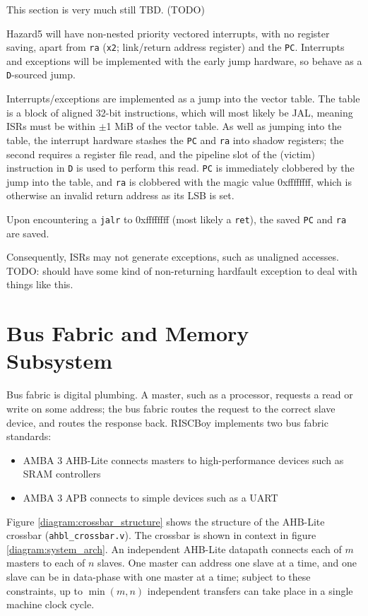 \documentclass[notitlepage]{article}
\begin{document}
This section is very much still TBD. (TODO)

Hazard5 will have non-nested priority vectored interrupts, with no register saving, apart from \texttt{ra} (\texttt{x2}; link/return address register) and the \texttt{PC}. Interrupts and exceptions will be implemented with the early jump hardware, so behave as a \texttt{D}-sourced jump.

Interrupts/exceptions are implemented as a jump into the vector table. The table is a block of aligned 32-bit instructions, which will most likely be JAL, meaning ISRs must be within $\pm$1 MiB of the vector table. As well as jumping into the table, the interrupt hardware stashes the \texttt{PC} and \texttt{ra} into shadow registers; the second requires a register file read, and the pipeline slot of the (victim) instruction in \texttt{D} is used to perform this read. \texttt{PC} is immediately clobbered by the jump into the table, and \texttt{ra} is clobbered with the magic value 0xffffffff, which is otherwise an invalid return address as its LSB is set.

Upon encountering a \texttt{jalr} to 0xffffffff (most likely a \texttt{ret}), the saved \texttt{PC} and \texttt{ra} are saved.

Consequently, ISRs may not generate exceptions, such as unaligned accesses. TODO: should have some kind of non-returning hardfault exception to deal with things like this.

\section{Bus Fabric and Memory Subsystem}

Bus fabric is digital plumbing. A master, such as a processor, requests a read or write on some address; the bus fabric routes the request to the correct slave device, and routes the response back. RISCBoy implements two bus fabric standards:

\begin{itemize}
\item AMBA 3 AHB-Lite connects masters to high-performance devices such as SRAM controllers
\item AMBA 3 APB connects to simple devices such as a UART
\end{itemize}

Figure \ref{diagram:crossbar_structure} shows the structure of the AHB-Lite crossbar (\texttt{ahbl\_crossbar.v}). The crossbar is shown in context in figure \ref{diagram:system_arch}. An independent AHB-Lite datapath connects each of $m$ masters to each of $n$ slaves. One master can address one slave at a time, and one slave can be in data-phase with one master at a time; subject to these constraints, up to $\min(m,n)$ independent transfers can take place in a single machine clock cycle.
\end{document}
